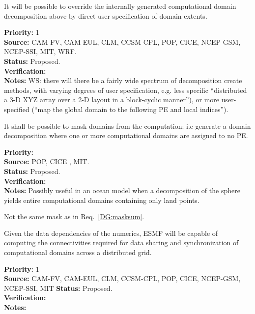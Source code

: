 
It will be possible to override the internally generated computational
domain decomposition above by direct user specification of domain
extents.

\begin{reqlist}
{\bf Priority:} 1 \\ 
{\bf Source:} CAM-FV, CAM-EUL, CLM, CCSM-CPL, POP, CICE, NCEP-GSM, NCEP-SSI, MIT, WRF. \\
{\bf Status:} Proposed. \\
{\bf Verification:} \\
{\bf Notes:} WS:  there will there be a fairly wide spectrum 
of decomposition create methods, with varying degrees of user
specification, e.g. less specific ``distributed a 3-D XYZ array 
over a 2-D layout in a block-cyclic manner''), or more 
user-specified (``map the global domain to the following PE 
and local indices'').

\end{reqlist}

 \label{DG:masklayout}

It shall be possible to mask domains from the computation: i.e
generate a domain decomposition where one or more computational
domains are assigned to no PE.

\begin{reqlist}
{\bf Priority:} \\
{\bf Source:} POP, CICE , MIT. \\
{\bf Status:} Proposed. \\
{\bf Verification:} \\
{\bf Notes:} Possibly useful in an ocean model when a decomposition
  of the sphere yields entire computational domains containing only
  land points.

  Not the same mask as in Req.~\ref{DG:masksum}.
\end{reqlist}


Given the data dependencies of the numerics, ESMF will be capable of
computing the connectivities required for data sharing and
synchronization of computational domains across a distributed grid.


\begin{reqlist}
{\bf Priority:} 1 \\ 
{\bf Source:} CAM-FV, CAM-EUL, CLM, CCSM-CPL, POP, CICE, NCEP-GSM, NCEP-SSI, MIT
{\bf Status:} Proposed. \\
{\bf Verification:} \\
{\bf Notes:} 

\end{reqlist}

